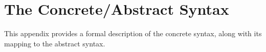 \section{The Concrete/Abstract Syntax}\label{sec:spec}
%
This appendix provides a formal description of the concrete syntax, along with its mapping to the abstract syntax.